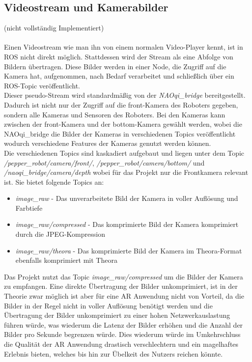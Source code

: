 \subsection{Videostream und Kamerabilder}\label{subsec:Videostream}
(nicht vollständig Implementiert)\\\\
Einen Videostream wie man ihn von einem normalen Video-Player kennt, ist in \ac{ROS} nicht direkt möglich. Stattdessen wird der Stream als eine Abfolge von Bildern übertragen. Diese Bilder werden in einer Node, die Zugriff auf die Kamera hat, aufgenommen, nach Bedarf verarbeitet und schließlich über ein \ac{ROS}-Topic veröffentlicht.\\
Dieser pseudo-Stream wird standardmäßig von der \textit{NAOqi\_bridge} bereitgestellt. Dadurch ist nicht nur der Zugriff auf die front-Kamera des Roboters gegeben, sondern alle Kameras und Sensoren des Roboters. Bei den Kameras kann zwischen der front-Kamera und der bottom-Kamera gewählt werden, wobei die NAOqi\_bridge die Bilder der Kameras in verschiedenen Topics veröffentlicht wodurch verschiedene Features der Kameras genutzt werden können.\\
Die verschiedenen Topics sind kaskadiert aufgebaut und liegen unter dem Topic \textit{/pepper\_robot/camera/front/}, \textit{/pepper\_robot/camera/bottom/} und \textit{/naoqi\_bridge/camera/depth}  wobei für das Projekt nur die Frontkamera relevant ist. Sie bietet folgende Topics an:
\begin{itemize}
    \item \textit{image\_raw} - Das unverarbeitete Bild der Kamera in voller Auflösung und Farbtiefe
    \item \textit{image\_raw/compressed} - Das komprimierte Bild der Kamera komprimiert durch die \ac{JPEG}-Kompression
    \item \textit{image\_raw/theora} - Das komprimierte Bild der Kamera im Theora-Format ebenfalls komprimiert mit Theora
\end{itemize}
Das Projekt nutzt das Topic \textit{image\_raw/compressed} um die Bilder der Kamera zu empfangen. Eine direkte Übertragung der Bilder unkomprimiert, ist in der Theorie zwar möglich ist aber für eine \ac{AR} Anwendung nicht von Vorteil, da die Bilder in der Regel nicht in voller Auflösung benötigt werden und die Übertragung der Bilder unkomprimiert zu einer hohen Netzwerkauslastung führen würde, was wiederum die Latenz der Bilder erhöhen und die Anzahl der Bilder pro Sekunde begrenzen würde. Dies wiederum würde im Umkehrschluss die Qualität der \ac{AR} Anwendung drastisch verschlechtern und ein magelhaftes Erlebnis bieten, welches bis hin zur Übelkeit des Nutzers reichen könnte.\\
